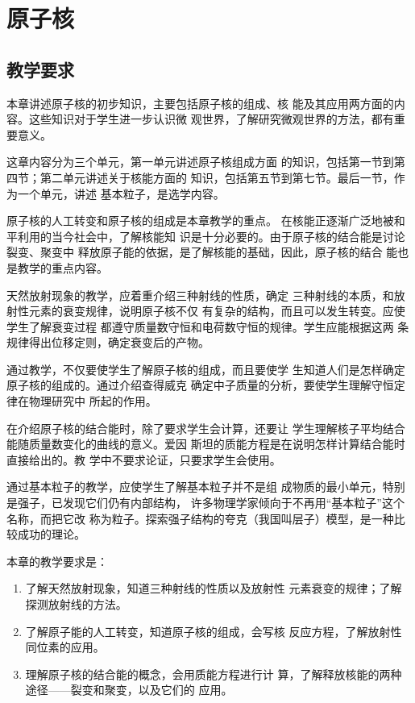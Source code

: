 \chapter{原子核}
\minitoc[n]

\section{教学要求}

本章讲述原子核的初步知识，主要包括原子核的组成、核
能及其应用两方面的内容。这些知识对于学生进一步认识微
观世界，了解研究微观世界的方法，都有重要意义。

这章内容分为三个单元，第一单元讲述原子核组成方面
的知识，包括第一节到第四节；第二单元讲述关于核能方面的
知识，包括第五节到第七节。最后一节，作为一个单元，讲述
基本粒子，是选学内容。

原子核的人工转变和原子核的组成是本章教学的重点。
在核能正逐渐广泛地被和平利用的当今社会中，了解核能知
识是十分必要的。由于原子核的结合能是讨论裂变、聚变中
释放原子能的依据，是了解核能的基础，因此，原子核的结合
能也是教学的重点内容。

天然放射现象的教学，应着重介绍三种射线的性质，确定
三种射线的本质，和放射性元素的衰变规律，说明原子核不仅
有复杂的结构，而且可以发生转变。应使学生了解衰变过程
都遵守质量数守恒和电荷数守恒的规律。学生应能根据这两
条规律得出位移定则，确定衰变后的产物。

通过教学，不仅要使学生了解原子核的组成，而且要使学
生知道人们是怎样确定原子核的组成的。通过介绍查得威克
确定中子质量的分析，要使学生理解守恒定律在物理研究中
所起的作用。

在介绍原子核的结合能时，除了要求学生会计算，还要让
学生理解核子平均结合能随质量数变化的曲线的意义。爱因
斯坦的质能方程是在说明怎样计算结合能时直接给出的。教
学中不要求论证，只要求学生会使用。

通过基本粒子的教学，应使学生了解基本粒子并不是组
成物质的最小单元，特别是强子，已发现它们仍有内部结构，
许多物理学家倾向于不再用“基本粒子”这个名称，而把它改
称为粒子。探索强子结构的夸克（我国叫层子）模型，是一种比
较成功的理论。


本章的教学要求是：
\begin{enumerate}
\item 了解天然放射现象，知道三种射线的性质以及放射性
元素衰变的规律；了解探测放射线的方法。
\item 了解原子能的人工转变，知道原子核的组成，会写核
反应方程，了解放射性同位素的应用。
\item 理解原子核的结合能的概念，会用质能方程进行计
算，了解释放核能的两种途径——裂变和聚变，以及它们的
应用。
\end{enumerate}

